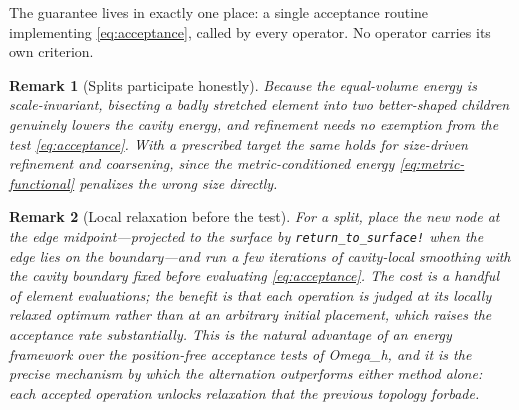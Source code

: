 \documentclass[11pt]{article}
\newcommand{\code}[1]{\texttt{#1}}
\newcommand{\omegah}{Omega\_h}
\newtheorem{remark}{Remark}
\begin{document}
The guarantee lives in exactly one place: a single acceptance routine
implementing \eqref{eq:acceptance}, called by every operator. No operator
carries its own criterion.

\begin{remark}[Splits participate honestly]
\label{rem:splits}
Because the equal-volume energy is scale-invariant, bisecting a badly
stretched element into two better-shaped children genuinely lowers the
cavity energy, and refinement needs no exemption from the test
\eqref{eq:acceptance}. With a prescribed target the same holds for
size-driven refinement and coarsening, since the metric-conditioned
energy \eqref{eq:metric-functional} penalizes the wrong size directly.
\end{remark}

\begin{remark}[Local relaxation before the test]
\label{rem:relax}
For a split, place the new node at the edge midpoint---projected to the
surface by \code{return\_to\_surface!} when the edge lies on the
boundary---and run a few iterations of cavity-local smoothing with the
cavity boundary fixed before evaluating \eqref{eq:acceptance}. The cost is a
handful of element evaluations; the benefit is that each operation is
judged at its locally relaxed optimum rather than at an arbitrary
initial placement, which raises the acceptance rate substantially. This
is the natural advantage of an energy framework over the position-free
acceptance tests of \omegah{}, and it is the precise mechanism by which
the alternation outperforms either method alone: each accepted
operation unlocks relaxation that the previous topology forbade.


\end{remark}
\end{document}
